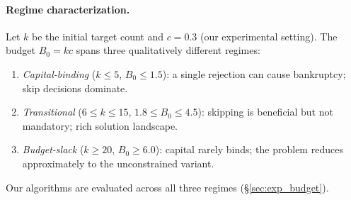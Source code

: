 \paragraph{Regime characterization.}
Let $k$ be the initial target count and $c = 0.3$ (our experimental setting).
The budget $B_0 = kc$ spans three qualitatively different regimes:
\begin{enumerate}[leftmargin=*,topsep=2pt,itemsep=0pt]
  \item \emph{Capital-binding} ($k \le 5$, $B_0 \le 1.5$):
    a single rejection can cause bankruptcy; skip decisions dominate.
  \item \emph{Transitional} ($6 \le k \le 15$, $1.8 \le B_0 \le 4.5$):
    skipping is beneficial but not mandatory; rich solution landscape.
  \item \emph{Budget-slack} ($k \ge 20$, $B_0 \ge 6.0$):
    capital rarely binds; the problem reduces approximately to the unconstrained
    variant.
\end{enumerate}
Our algorithms are evaluated across all three regimes (§\ref{sec:exp_budget}).
